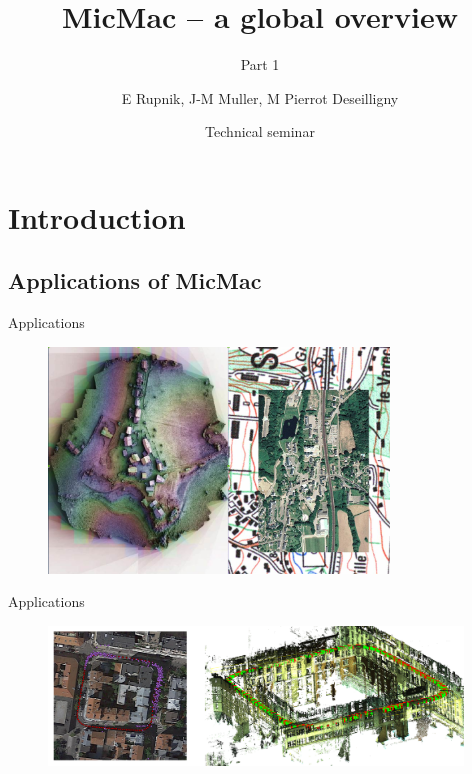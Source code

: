 \documentclass{beamer}
\title{MicMac -- a global overview}
\subtitle{Part 1}
\institute{IGN}
\date[25 May 2018]{Technical seminar}
\author[E Rupnik]{E Rupnik, J-M Muller, M Pierrot Deseilligny}
\begin{document}
    \begin{frame}[plain]
        \titlepage{}
    \end{frame}

	\tableofcontents
	

	
	
      \section{Introduction}  
      	\subsection*{Applications of MicMac}
		\begin{frame}{Applications}
		 
			\begin{figure}
			  \includegraphics[height=6cm]{../MicmacQuickMay2018/images/usage2}
			\end{figure}
		\end{frame}	
		
		\begin{frame}{Applications}
			\begin{figure}
			  \includegraphics[width=11cm]{images/trajectory.png}
			\end{figure}
		\end{frame}	
		
\end{document}
